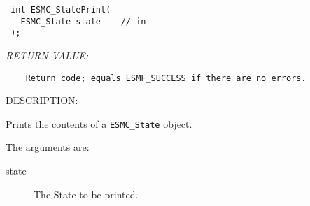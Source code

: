   
\begin{verbatim} int ESMC_StatePrint(
   ESMC_State state    // in
 );\end{verbatim}{\em RETURN VALUE:}
\begin{verbatim}    Return code; equals ESMF_SUCCESS if there are no errors.\end{verbatim}
{\sf DESCRIPTION:\\ }


  
    Prints the contents of a {\tt ESMC\_State} object.
  
    The arguments are:
    \begin{description}
    \item[state]
      The State to be printed.
    \end{description}
  
\setlength{\parskip}{\oldparskip}
\setlength{\parindent}{\oldparindent}
\setlength{\baselineskip}{\oldbaselineskip}
